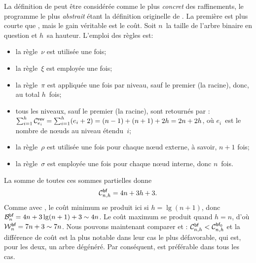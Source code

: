La définition de  peut être considérée
comme le plus \emph{concret} des raffinements, le programme le plus
\emph{abstrait} étant la définition originelle de
. La première est plus
courte que , mais le gain
véritable est le coût. Soit \(n\)~la taille de l'arbre binaire en
question et \(h\)~sa hauteur. L'emploi
des règles est:
\begin{itemize}

  \item la règle~\(\nu\) est utilisée une fois;

  \item la règle~\(\xi\) est employée une fois;

  \item la règle~\(\pi\) est appliquée une fois par niveau, sauf le
    premier (la racine), donc, au total \(h\)~fois;

  \item tous les niveaux, sauf le premier (la racine), sont retournés
    par : \(\sum_{i=1}^{h}\C{\fun{rev}}{e_i} =
    \sum_{i=1}^{h}(e_i+2) = (n-1)+(n+1)+ 2h = 2n +
    2h\), où \(e_i\)~est le nombre de
    n{\oe}uds au niveau étendu~\(i\);

  \item la règle~\(\rho\) est utilisée une fois pour chaque n{\oe}ud
    externe, à savoir, \(n+1\) fois;

  \item la règle~\(\sigma\) est employée une fois pour chaque n{\oe}ud
    interne, donc \(n\)~fois.

\end{itemize}
La somme de toutes ces sommes partielles donne
\begin{equation*}
\C{\fun{bf}}{n,h} = 4n + 3h + 3.\index{bf@$\C{\fun{bf}}{n,h}$}
\end{equation*}
Comme avec , le coût
minimum se produit ici si \(h = \lg(n+1)\), donc \(\B{\fun{bf}}{n} =
4n + 3\lg(n+1) + 3 \sim 4n\). Le coût
maximum se produit quand \(h=n\), d'où \(\W{\fun{bf}}{n} = 7n + 3 \sim
7n\). Nous pouvons maintenant comparer
 et
: \(\C{\fun{bf}}{n,h} <
\C{\fun{bf}_0}{n,h}\)
 et la différence de coût est la plus
notable dans leur cas le plus défavorable, qui est, pour les deux, un
arbre dégénéré. Par conséquent,  est préférable dans tous
les cas.

